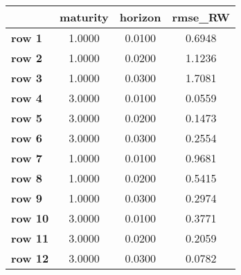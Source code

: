 \begin{tiny}\begin{tabular}{|l|c|c|c|}
\hline
&\textbf{maturity}&\textbf{horizon}&\textbf{rmse_RW}\\\hline
\textbf{row 1}&1.0000&0.0100&0.6948\\\hline
\textbf{row 2}&1.0000&0.0200&1.1236\\\hline
\textbf{row 3}&1.0000&0.0300&1.7081\\\hline
\textbf{row 4}&3.0000&0.0100&0.0559\\\hline
\textbf{row 5}&3.0000&0.0200&0.1473\\\hline
\textbf{row 6}&3.0000&0.0300&0.2554\\\hline
\textbf{row 7}&1.0000&0.0100&0.9681\\\hline
\textbf{row 8}&1.0000&0.0200&0.5415\\\hline
\textbf{row 9}&1.0000&0.0300&0.2974\\\hline
\textbf{row 10}&3.0000&0.0100&0.3771\\\hline
\textbf{row 11}&3.0000&0.0200&0.2059\\\hline
\textbf{row 12}&3.0000&0.0300&0.0782\\\hline
\end{tabular}
\end{tiny}